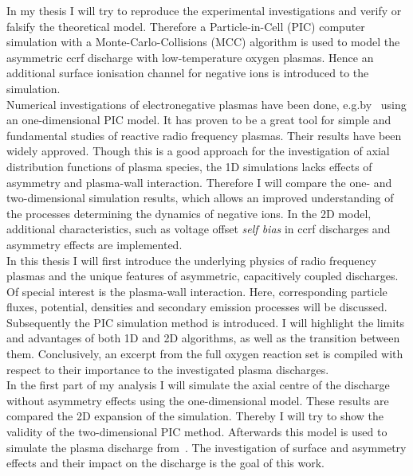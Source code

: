 %        
        In my thesis I will try to reproduce the experimental investigations and verify or falsify the theoretical model. Therefore a Particle-in-Cell (PIC) computer simulation with a Monte-Carlo-Collisions (MCC) algorithm is used to model the asymmetric ccrf discharge with low-temperature oxygen plasmas. Hence an additional surface ionisation channel for negative ions is introduced to the simulation.\\
        Numerical investigations of electronegative plasmas have been done, e.g.\@ by~\cite{Matyash07oxIII,Bronold07b,Matthias15} using an one-dimensional PIC model. It has proven to be a great tool for simple and fundamental studies of reactive radio frequency plasmas. Their results have been widely approved. Though this is a good approach for the investigation of axial distribution functions of plasma species, the 1D simulations lacks effects of asymmetry and plasma-wall interaction. Therefore I will compare the one- and two-dimensional simulation results, which allows an improved understanding of the processes determining the dynamics of negative ions. In the 2D model, additional characteristics, such as voltage offset \emph{self bias} in ccrf discharges and asymmetry effects are implemented.\\
        \newline
        In this thesis I will first introduce the underlying physics of radio frequency plasmas and the unique features of asymmetric, capacitively coupled discharges. Of special interest is the plasma-wall interaction. Here, corresponding particle fluxes, potential, densities and secondary emission processes will be discussed. Subsequently the PIC simulation method is introduced. I will highlight the limits and advantages of both 1D and 2D algorithms, as well as the transition between them. Conclusively, an excerpt from the full oxygen reaction set is compiled with respect to their importance to the investigated plasma discharges.\\
        In the first part of my analysis I will simulate the axial centre of the discharge without asymmetry effects using the one-dimensional model. These results are compared the 2D expansion of the simulation. Thereby I will try to show the validity of the two-dimensional PIC method. Afterwards this model is used to simulate the plasma discharge from~\cite{Scheuer15}. The investigation of surface and asymmetry effects and their impact on the discharge is the goal of this work.